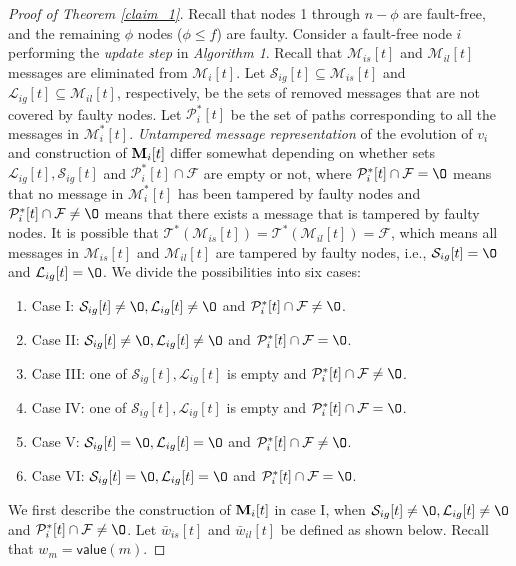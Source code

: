 \documentclass[letterpaper, 11pt]{article}
\newcommand{\calF}{{\mathcal{F}}}
\newcommand{\calL}{{\mathcal{L}}}
\newcommand{\calM}{{\mathcal{M}}}
\newcommand{\calP}{{\mathcal{P}}}
\newcommand{\calS}{{\mathcal{S}}}
\newcommand{\calT}{{\mathcal{T}}}
\begin{document}
\begin{proof}[Proof of Theorem \ref{claim_1}]
 
Recall that nodes 1 through $n-\phi$ are fault-free, and the remaining
$\phi$ nodes ($\phi\leq f$) are faulty.
Consider a fault-free node $i$ performing the {\em update step}
in \emph {Algorithm 1}.
Recall that $\calM_{is}[t]$ and $\calM_{il}[t]$ messages are eliminated from $\calM_i[t]$. Let $\calS_{ig}[t]\subseteq \calM_{is}[t]$ and $\calL_{ig}[t]\subseteq \calM_{il}[t]$, respectively, be the sets of removed messages that are not covered by faulty nodes.
Let $\calP_i^{*}[t]$ be the set of paths corresponding to all the messages in $\calM^{*}_i[t]$.
\emph{Untampered message representation} of the evolution of $v_i$ and construction of ${\bf{M}}_i[t]$ differ somewhat depending on whether sets $\calL_{ig}[t], \calS_{ig}[t]$ and $\calP_i^{*}[t]\cap \calF$ are empty or not, where $\calP_i^{*}[t]\cap \calF=\O$ means that no message in $\calM_i^*[t]$ has been tampered by faulty nodes and $\calP_i^{*}[t]\cap \calF\not=\O$ means that there exists a message that is tampered by faulty nodes. It is possible that $\calT^*(\calM_{is}[t])=\calT^*(\calM_{il}[t])=\calF$, which means all messages in $\calM_{is}[t]$ and $\calM_{il}[t]$ are tampered by faulty nodes, i.e., $\calS_{ig}[t]=\O$ and $\calL_{ig}[t]=\O$. We divide the possibilities into six cases:

\begin{enumerate}
\item Case I: $\calS_{ig}[t]\not=\O, \calL_{ig}[t]\not=\O$ and $\calP_i^{*}[t]\cap \calF\not=\O$.
\item Case II: $\calS_{ig}[t]\not=\O, \calL_{ig}[t]\not=\O$ and $\calP_i^{*}[t]\cap \calF=\O$.
\item Case III: one of $\calS_{ig}[t], \calL_{ig}[t]$ is empty and $\calP_i^{*}[t]\cap \calF\not=\O$.
\item Case IV: one of $\calS_{ig}[t], \calL_{ig}[t]$ is empty and $\calP_i^{*}[t]\cap \calF=\O$.
\item Case V: $\calS_{ig}[t]=\O, \calL_{ig}[t]=\O$ and $\calP_i^{*}[t]\cap \calF\not=\O$.
\item Case VI: $\calS_{ig}[t]=\O, \calL_{ig}[t]=\O$ and $\calP_i^{*}[t]\cap \calF=\O$.
\end{enumerate}

We first describe the construction of ${\bf M}_i[t]$ in case I, when $\calS_{ig}[t]\not=\O, \calL_{ig}[t]\not=\O$ and $\calP_i^{*}[t]\cap \calF\not=\O$.
Let $\bar{w}_{is}[t]$ and $\bar{w}_{il}[t]$ be defined as shown below. Recall that $w_m=\mathsf{value}(m)$.




\end{proof}
\end{document}
